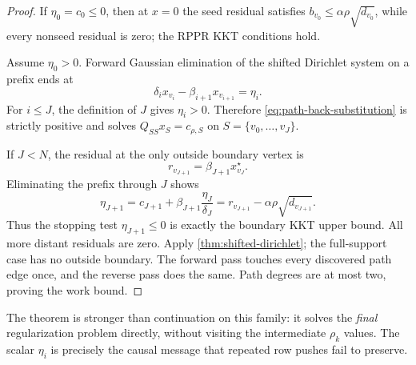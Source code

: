\begin{proof}
If $\eta_0=c_0\leq0$, then at $x=0$ the seed residual satisfies
$b_{v_0}\leq\alpha\rho\sqrt{d_{v_0}}$, while every nonseed residual is zero;
the RPPR KKT conditions hold.

Assume $\eta_0>0$.  Forward Gaussian elimination of the shifted Dirichlet
system on a prefix ends at
\begin{equation}
 \delta_i x_{v_i}-\beta_{i+1}x_{v_{i+1}}=\eta_i.
 \label{eq:path-eliminated-row}
\end{equation}
For $i\leq J$, the definition of $J$ gives $\eta_i>0$.  Therefore
\cref{eq:path-back-substitution} is strictly positive and solves
$Q_{SS}x_S=c_{\rho,S}$ on $S=\{v_0,\ldots,v_J\}$.

If $J<N$, the residual at the only outside boundary vertex is
\begin{equation}
 r_{v_{J+1}}=\beta_{J+1}x_{v_J}^\star.
 \label{eq:path-frontier-residual}
\end{equation}
Eliminating the prefix through $J$ shows
\begin{equation}
 \eta_{J+1}
 =c_{J+1}+\beta_{J+1}\frac{\eta_J}{\delta_J}
 =r_{v_{J+1}}-\alpha\rho\sqrt{d_{v_{J+1}}}.
 \label{eq:path-message-is-kkt}
\end{equation}
Thus the stopping test $\eta_{J+1}\leq0$ is exactly the boundary KKT upper
bound.  All more distant residuals are zero.  Apply
\cref{thm:shifted-dirichlet}; the full-support case has no outside boundary.
The forward pass touches every discovered path edge once, and the reverse
pass does the same.  Path degrees are at most two, proving the work bound.
\end{proof}

The theorem is stronger than continuation on this family: it solves the
\emph{final} regularization problem directly, without visiting the
intermediate $\rho_k$ values.  The scalar $\eta_i$ is precisely the causal
message that repeated row pushes fail to preserve.
